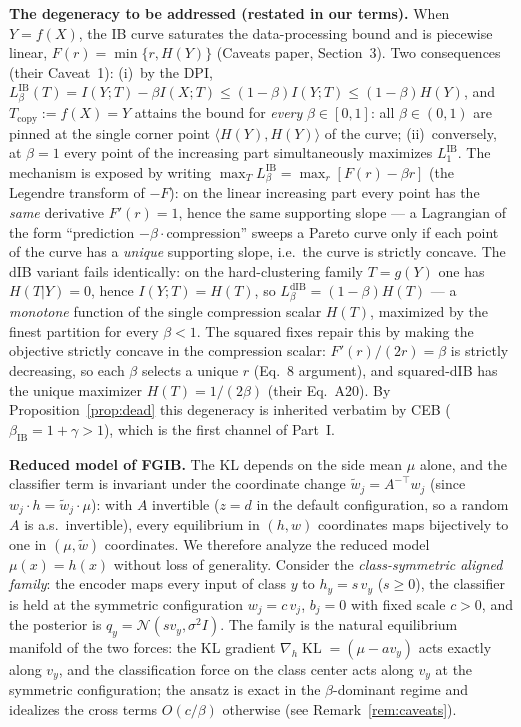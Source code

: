 \textbf{The degeneracy to be addressed (restated in our terms).}
When $Y = f(X)$, the IB curve saturates the data-processing bound and is piecewise
linear, $F(r) = \min\{r, H(Y)\}$ (Caveats paper, Section~3). Two consequences (their
Caveat~1): (i)~by the DPI, $L^{\mathrm{IB}}_\beta(T) = I(Y;T) - \beta I(X;T)
\le (1-\beta)I(Y;T) \le (1-\beta)H(Y)$, and $T_{\mathrm{copy}} := f(X) = Y$ attains the
bound for \emph{every} $\beta \in [0,1]$: all $\beta \in (0,1)$ are pinned at the single
corner point $\langle H(Y), H(Y)\rangle$ of the curve; (ii)~conversely, at $\beta = 1$
every point of the increasing part simultaneously maximizes $L^{\mathrm{IB}}_1$. The
mechanism is exposed by writing $\max_T L^{\mathrm{IB}}_\beta = \max_r [F(r) - \beta r]$
(the Legendre transform of $-F$): on the linear increasing part every point has the
\emph{same} derivative $F'(r) = 1$, hence the same supporting slope --- a Lagrangian of
the form ``prediction $-\beta\cdot{}$compression'' sweeps a Pareto curve only if each
point of the curve has a \emph{unique} supporting slope, i.e.\ the curve is strictly
concave. The dIB variant fails identically: on the hard-clustering family $T = g(Y)$ one
has $H(T|Y) = 0$, hence $I(Y;T) = H(T)$, so $L^{\mathrm{dIB}}_\beta = (1-\beta)H(T)$
--- a \emph{monotone} function of the single compression scalar $H(T)$, maximized by the
finest partition for every $\beta < 1$. The squared fixes repair this by making the
objective strictly concave in the compression scalar: $F'(r)/(2r) = \beta$ is strictly
decreasing, so each $\beta$ selects a unique $r$ (Eq.~8 argument), and squared-dIB has
the unique maximizer $H(T) = 1/(2\beta)$ (their Eq.~A20). By Proposition~\ref{prop:dead}
this degeneracy is inherited verbatim by CEB ($\beta_{\mathrm{IB}} = 1+\gamma > 1$),
which is the first channel of Part~I.

\textbf{Reduced model of FGIB.}
The KL depends on the side mean $\mu$ alone, and the classifier term is invariant under
the coordinate change $\tilde w_j = A^{-\top} w_j$ (since $w_j \cdot h =
\tilde w_j \cdot \mu$): with $A$ invertible ($z = d$ in the default configuration, so a
random $A$ is a.s.\ invertible), every equilibrium in $(h, w)$ coordinates maps
bijectively to one in $(\mu, \tilde w)$ coordinates. We therefore analyze the reduced
model $\mu(x) = h(x)$ without loss of generality.
Consider the \emph{class-symmetric aligned family}: the encoder maps every input of
class $y$ to $h_y = s\,v_y$ ($s \ge 0$), the classifier is held at the symmetric
configuration $w_j = c\,v_j$, $b_j = 0$ with fixed scale $c > 0$, and the posterior is
$q_y = \mathcal{N}(s v_y, \sigma^2 I)$. The family is the natural equilibrium manifold of
the two forces: the KL gradient $\nabla_h \operatorname{KL} = (\mu - a v_y)$ acts exactly
along $v_y$, and the classification force on the class center acts along $v_y$ at the
symmetric configuration; the ansatz is exact in the $\beta$-dominant regime and
idealizes the cross terms $O(c/\beta)$ otherwise (see Remark~\ref{rem:caveats}).

